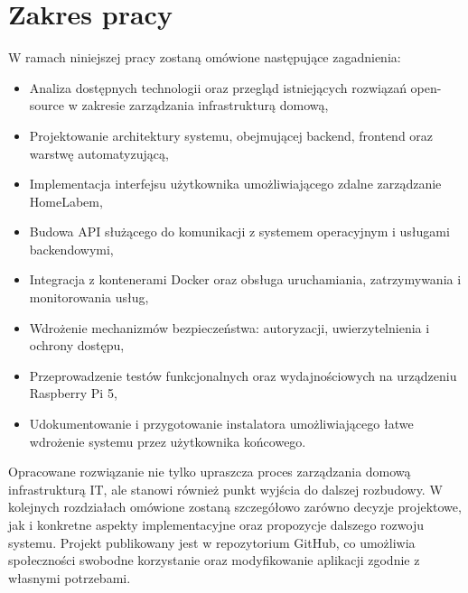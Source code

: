 \section{Zakres pracy}

W ramach niniejszej pracy zostaną omówione następujące zagadnienia:
\begin{itemize}
    \item Analiza dostępnych technologii oraz przegląd istniejących rozwiązań open-source w zakresie zarządzania infrastrukturą domową,
    \item Projektowanie architektury systemu, obejmującej backend, frontend oraz warstwę automatyzującą,
    \item Implementacja interfejsu użytkownika umożliwiającego zdalne zarządzanie HomeLabem,
    \item Budowa API służącego do komunikacji z systemem operacyjnym i usługami backendowymi,
    \item Integracja z kontenerami Docker oraz obsługa uruchamiania, zatrzymywania i monitorowania usług,
    \item Wdrożenie mechanizmów bezpieczeństwa: autoryzacji, uwierzytelnienia i ochrony dostępu,
    \item Przeprowadzenie testów funkcjonalnych oraz wydajnościowych na urządzeniu Raspberry Pi 5,
    \item Udokumentowanie i przygotowanie instalatora umożliwiającego łatwe wdrożenie systemu przez użytkownika końcowego.
\end{itemize}

Opracowane rozwiązanie nie tylko upraszcza proces zarządzania domową infrastrukturą IT, ale stanowi również punkt wyjścia do dalszej rozbudowy. W kolejnych rozdziałach omówione zostaną szczegółowo zarówno decyzje projektowe, jak i konkretne aspekty implementacyjne oraz propozycje dalszego rozwoju systemu. Projekt publikowany jest w repozytorium GitHub, co umożliwia społeczności swobodne korzystanie oraz modyfikowanie aplikacji zgodnie z własnymi potrzebami.
